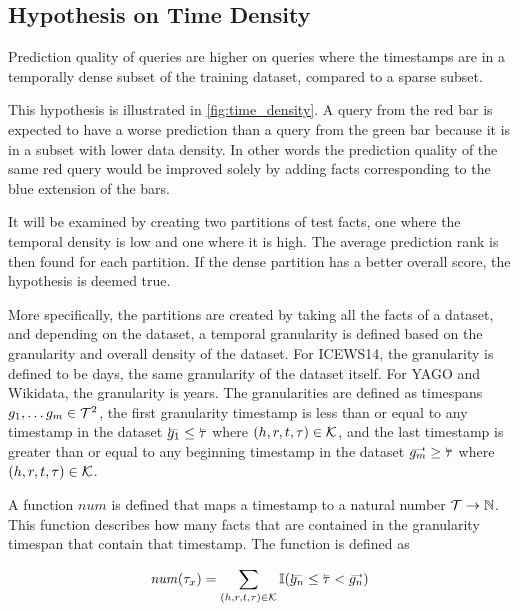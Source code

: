 \subsection{Hypothesis on Time Density}
\label{sec:hypothesis_time_density}

\begin{hypothesis}
\label{hyp:time_density}
Prediction quality of queries are higher on queries where the timestamps are in a temporally dense subset of the training dataset, compared to a sparse subset.
\end{hypothesis}



This hypothesis is illustrated in \autoref{fig:time_density}. A query from the red bar is expected to have a worse prediction than a query from the green bar because it is in a subset with lower data density. In other words the prediction quality of the same red query would be improved solely by adding facts corresponding to the blue extension of the bars.

It will be examined by creating two partitions of test facts, one where the temporal density is low and one where it is high. The average prediction rank is then found for each partition. If the dense partition has a better overall score, the hypothesis is deemed true.

More specifically, the partitions are created by taking all the facts of a dataset, and depending on the dataset, a temporal granularity is defined based on the granularity and overall density of the dataset. For ICEWS14, the granularity is defined to be days, the same granularity of the dataset itself. For YAGO and Wikidata, the granularity is years. The granularities are defined as timespans $g_1, \dots g_m \in \mathcal{T}^2$, the first granularity timestamp is less than or equal to any timestamp in the dataset $\timebegin{g_1} \leq \timebegin{\tau}$ where $(h, r, t, \tau) \in \mathcal{K}$, and the last timestamp is greater than or equal to any beginning timestamp in the dataset $\timeend{g_m} \geq \timebegin{\tau}$ where $(h, r, t, \tau) \in \mathcal{K}$.

A function $\mathit{num}$ is defined that maps a timestamp to a natural number $\mathcal{T} \rightarrow \mathbb{N}$. This function describes how many facts that are contained in the granularity timespan that contain that timestamp. The function is defined as

\begin{equation}
\mathit{num}(\tau_x) = \varsum_{(h, r, t, \tau) \in \varK} \I ( \timebegin{g_n} \leq \timebegin{\tau} < \timeend{g_n} )
\end{equation}

